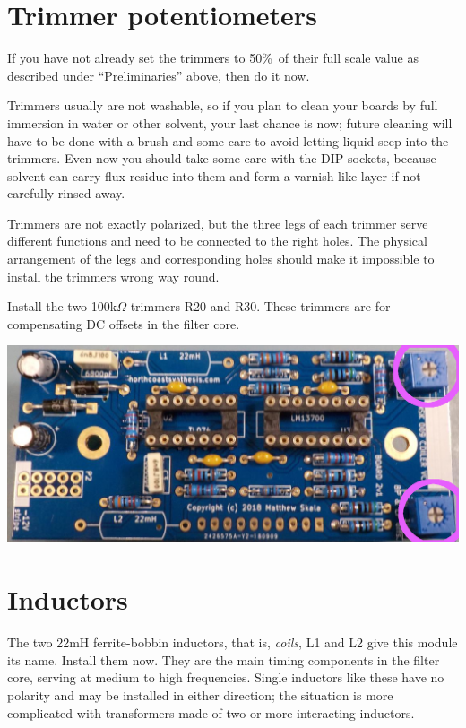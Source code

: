 \section{Trimmer potentiometers}

If you have not already set the trimmers to 50\%\ of their full scale value
as described under ``Preliminaries'' above, then do it now.

Trimmers usually are not washable, so if you plan to clean your boards by
full immersion in water or other solvent,
your last chance is now; future cleaning will have to
be done with a brush and some care to avoid letting liquid seep into the
trimmers.  Even now you should take some care with the DIP sockets, because
solvent can carry flux residue into them and form a varnish-like layer if
not carefully rinsed away.

Trimmers are not exactly polarized, but the three legs of each trimmer serve
different functions and need to be connected to the right holes.  The
physical arrangement of the legs and corresponding holes should make it
impossible to install the trimmers wrong way round.

Install the two 100k$\Omega$ trimmers R20 and R30.  These trimmers
are for compensating DC offsets in the filter core.

\nopagebreak
\noindent\includegraphics[width=\linewidth]{pot-100k2.jpg}

\pagebreak

\section{Inductors}

The two 22mH ferrite-bobbin inductors, that is, \emph{coils}, L1 and L2 give
this module its name.  Install them now.  They are the main timing
components in the filter core, serving at medium to high frequencies. 
Single inductors like these have no polarity and may be installed in either
direction; the situation is more complicated with transformers made of two
or more interacting inductors.

